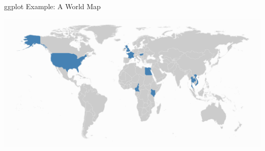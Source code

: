\documentclass[10pt,ignorenonframetext,]{beamer}
\begin{document}
\begin{frame}{ggplot Example: A World Map}

\begin{center}\includegraphics[width=1\linewidth]{SpatialDataLecture_files/figure-beamer/unnamed-chunk-39-1} \end{center}

\end{frame}
\end{document}
